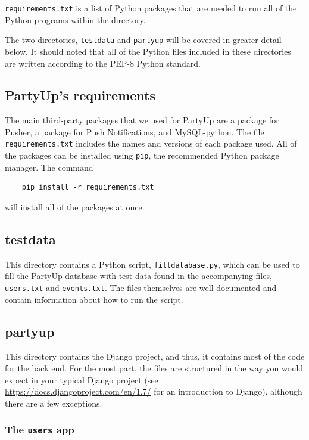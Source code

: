 \documentclass[12pt]{article}
\begin{document}
\texttt{requirements.txt} is a list of Python packages that are needed to
run all of the Python programs within the directory.

The two directories, \texttt{testdata} and \texttt{partyup} will be covered
in greater detail below.
It should noted that all of the Python files included in these directories
are written according to the PEP-8 Python standard.

\subsection{PartyUp's requirements}

The main third-party packages that we used for PartyUp are a package for Pusher, a package for Push Notifications, and MySQL-python. 
The file \texttt{requirements.txt} includes the names and versions of each package used.
All of the packages can be installed using \texttt{pip}, the recommended
Python package manager.
The command
\begin{lstlisting}
    pip install -r requirements.txt
\end{lstlisting}
will install all of the packages at once.

\subsection{testdata}

This directory contains a Python script, \texttt{filldatabase.py},
which can be used to fill the PartyUp database with test data
found in the accompanying files, \texttt{users.txt} and \texttt{events.txt}.
The files themselves are well documented and contain information about
how to run the script.

\subsection{partyup}

This directory contains the Django project, and thus,
it contains most of the code for the back end.
For the most part, the files are structured in the way you would
expect in your typical Django project
(see \url{https://docs.djangoproject.com/en/1.7/} for an introduction to Django),
although there are a few exceptions.

\subsubsection{The \texttt{users} app}
\end{document}
